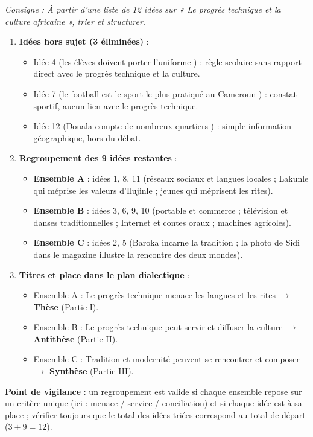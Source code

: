 \documentclass[11pt]{article}
\begin{document}
\begin{corrige}
\textit{Consigne : À partir d'une liste de 12 idées sur « Le progrès technique et la culture africaine », trier et structurer.}
\begin{enumerate}
\item \textbf{Idées hors sujet (3 éliminées)} :
\begin{itemize}
\item Idée 4 (\og les élèves doivent porter l'uniforme \fg) : règle scolaire sans rapport direct avec le progrès technique et la culture.
\item Idée 7 (\og le football est le sport le plus pratiqué au Cameroun \fg) : constat sportif, aucun lien avec le progrès technique.
\item Idée 12 (\og Douala compte de nombreux quartiers \fg) : simple information géographique, hors du débat.
\end{itemize}
\item \textbf{Regroupement des 9 idées restantes} :
\begin{itemize}
\item \textbf{Ensemble A} : idées 1, 8, 11 (réseaux sociaux et langues locales ; Lakunle qui méprise les valeurs d'Ilujinle ; jeunes qui méprisent les rites).
\item \textbf{Ensemble B} : idées 3, 6, 9, 10 (portable et commerce ; télévision et danses traditionnelles ; Internet et contes oraux ; machines agricoles).
\item \textbf{Ensemble C} : idées 2, 5 (Baroka incarne la tradition ; la photo de Sidi dans le magazine illustre la rencontre des deux mondes).
\end{itemize}
\item \textbf{Titres et place dans le plan dialectique} :
\begin{itemize}
\item Ensemble A : \og Le progrès technique menace les langues et les rites \fg{} $\rightarrow$ \textbf{Thèse} (Partie I).
\item Ensemble B : \og Le progrès technique peut servir et diffuser la culture \fg{} $\rightarrow$ \textbf{Antithèse} (Partie II).
\item Ensemble C : \og Tradition et modernité peuvent se rencontrer et composer \fg{} $\rightarrow$ \textbf{Synthèse} (Partie III).
\end{itemize}
\end{enumerate}
\textbf{Point de vigilance} : un regroupement est valide si chaque ensemble repose sur un critère unique (ici : menace / service / conciliation) et si chaque idée est à sa place ; vérifier toujours que le total des idées triées correspond au total de départ ($3 + 9 = 12$).
\end{corrige}
\end{document}
